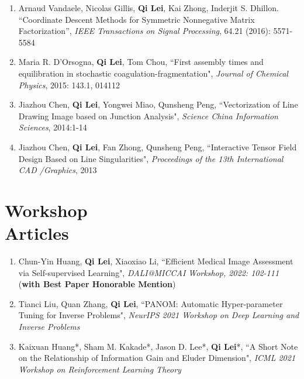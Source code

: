 \documentclass[margin, 10pt]{res} %
\begin{document}
\begin{resume}
\begin{enumerate}
	\item {Arnaud Vandaele, Nicolas Gillis, \textbf{Qi Lei},
      Kai Zhong, Inderjit S. Dhillon. ``Coordinate Descent Methods for
		Symmetric Nonnegative Matrix Factorization'', \textit{IEEE Transactions on 
Signal Processing}, 64.21 (2016): 5571-5584}	

	\item {Maria R. D'Orsogna, \textbf{Qi Lei}, Tom Chou, ``First assembly times and equilibration in stochastic coagulation-fragmentation", \textit{Journal of Chemical Physics}, 2015: 143.1, 014112}
		\item {Jiazhou Chen, \textbf{Qi Lei}, Yongwei Miao, Qunsheng Peng, ``Vectorization of Line Drawing Image based on Junction Analysis", \textit{Science China Information Sciences}, 2014:1-14}
	\item {Jiazhou Chen, \textbf{Qi Lei}, Fan Zhong, Qunsheng Peng, ``Interactive Tensor Field Design Based on Line Singularities", \textit{Proceedings of the 13th International CAD /Graphics}, 2013}
\end{enumerate}



\section{Workshop\\Articles}
\begin{enumerate}
	\item{Chun-Yin Huang, \textbf{Qi Lei}, Xiaoxiao Li, ``Efficient Medical Image Assessment via Self-supervised Learning", \textit{DALI@MICCAI Workshop, 2022: 102-111} (\textbf{with Best Paper Honorable Mention})}
	\item{Tianci Liu, Quan Zhang, \textbf{Qi Lei}, ``PANOM: Automatic Hyper-parameter Tuning for Inverse Problems", \textit{NeurIPS 2021 Workshop on Deep Learning and Inverse Problems} }
	\item {Kaixuan Huang*, Sham M. Kakade*, Jason D. Lee*, \textbf{Qi Lei}*,  ``A Short Note on the Relationship of Information Gain and Eluder Dimension", \textit{ICML 2021 Workshop on Reinforcement Learning Theory} }
	

\end{enumerate}
\end{resume}
\end{document}
